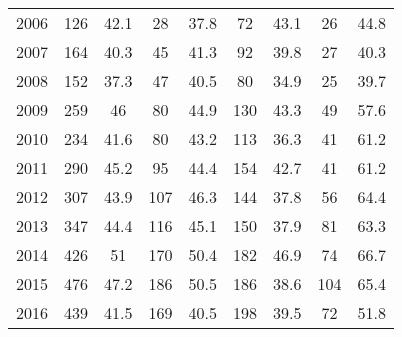 \begin{table}[htbp]
\begin{tabular}{l*{8}{c}}
2006      &      126&     42.1&       28&     37.8&       72&     43.1&       26&     44.8\\
2007      &      164&     40.3&       45&     41.3&       92&     39.8&       27&     40.3\\
2008      &      152&     37.3&       47&     40.5&       80&     34.9&       25&     39.7\\
2009      &      259&       46&       80&     44.9&      130&     43.3&       49&     57.6\\
2010      &      234&     41.6&       80&     43.2&      113&     36.3&       41&     61.2\\
2011      &      290&     45.2&       95&     44.4&      154&     42.7&       41&     61.2\\
2012      &      307&     43.9&      107&     46.3&      144&     37.8&       56&     64.4\\
2013      &      347&     44.4&      116&     45.1&      150&     37.9&       81&     63.3\\
2014      &      426&       51&      170&     50.4&      182&     46.9&       74&     66.7\\
2015      &      476&     47.2&      186&     50.5&      186&     38.6&      104&     65.4\\
2016      &      439&     41.5&      169&     40.5&      198&     39.5&       72&     51.8\\
\hline\hline
\end{tabular}
\end{table}
